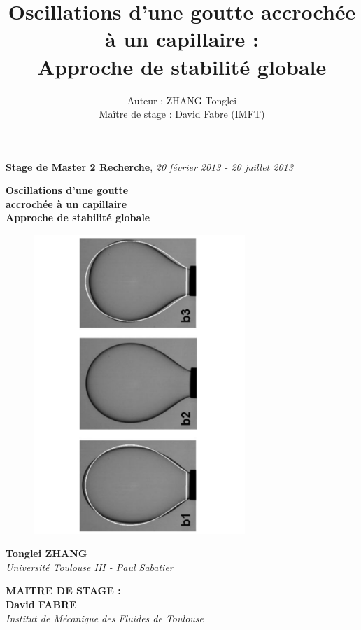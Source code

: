 \documentclass[a4paper]{report}
\title{Oscillations d'une goutte accrochée à un capillaire :\\Approche de stabilité globale}
\author{Auteur : ZHANG Tonglei \\[0.25cm] Maître de stage : David Fabre (IMFT) }
\date{}
\begin{document}
\begin{titlepage} 
\thispagestyle{empty} 
 

\vspace{6mm}\hspace{-14mm} 
\large \textbf{Stage de Master 2 Recherche}, \textsl{20 février 2013 - 20 juillet 2013}\\ 
\begin{center} 
\vspace{30mm} 
\huge \textbf{Oscillations d'une goutte \\ accrochée à un capillaire}\\ 
\Large \textbf{Approche de stabilité globale}\\ 
\vspace{1.5cm}

\begin{figure}[h!] 
\begin{center}
\includegraphics[width=8cm, angle=270]{title.pdf}
\end{center}
\end{figure} 

\vspace{0.3cm}
\large \textbf{Tonglei ZHANG \\} 
\textsl{Université Toulouse III - Paul Sabatier} 
 
\vspace{1cm} 
\large \textbf{MAITRE DE STAGE : \\ David FABRE}\\ 
\textsl{Institut de Mécanique des Fluides de Toulouse} 
\end{center} 

\end{titlepage}
\end{document}
